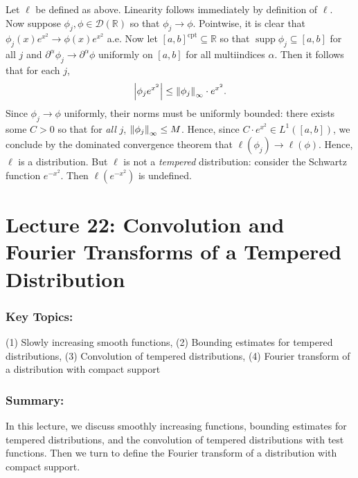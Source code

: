 \documentclass{article}
\begin{document}
\begin{itemize}
 		{\color{orange}
 			Let $\ell$ be defined as above. Linearity follows immediately by definition of $\ell$. Now suppose $\phi_{j}, \phi \in \mathcal{D}(\mathbb{R})$ so that $\phi_{j} \to \phi$. Pointwise, it is clear that $\phi_{j}(x)e^{x^{2}} \to \phi(x)e^{x^{2}}$ a.e. Now let $[a,b]^{\text{cpt}} \subseteq \mathbb{R}$ so that $\operatorname{supp}{\phi_{j}} \subseteq [a,b]$ for all $j$ and $\partial^{\alpha}\phi_{j} \to \partial^{\alpha}\phi$ uniformly on $[a,b]$ for all multiindices $\alpha$. Then it follows that for each $j$, 
 				\begin{equation}
 					\left| \phi_{j}e^{x^{2}} \right| \leq \left\Vert \phi_{j} \right\Vert_{\infty} \cdot e^{x^{2}}. 
 				\end{equation}
 			Since $\phi_{j} \to \phi$ uniformly, their norms must be uniformly bounded: there exists some $C > 0$ so that for \textit{all} $j$, $\left\Vert \phi_{j} \right\Vert_{\infty} \leq M$. Hence, since $C \cdot e^{x^{2}} \in L^{1}([a,b])$, we conclude by the dominated convergence theorem that $\ell(\phi_{j}) \to \ell(\phi)$. Hence, $\ell$ is a distribution. But $\ell$ is not a \textit{tempered} distribution: consider the Schwartz function $e^{-x^{2}}$. Then $\ell(e^{-x^{2}})$ is undefined. 
 		}
\end{itemize}

\newpage 
\section{Lecture 22: Convolution and Fourier Transforms of a Tempered Distribution}	
\subsubsection{Key Topics:} (1) Slowly increasing smooth functions, (2) Bounding estimates for tempered distributions, (3) Convolution of tempered distributions,  (4) Fourier transform of a distribution with compact support 

\subsubsection{Summary:} In this lecture, we discuss smoothly increasing functions, bounding estimates for tempered distributions, and the convolution of tempered distributions with test functions. Then we turn to define the Fourier transform of a distribution with compact support. 
\end{document}
